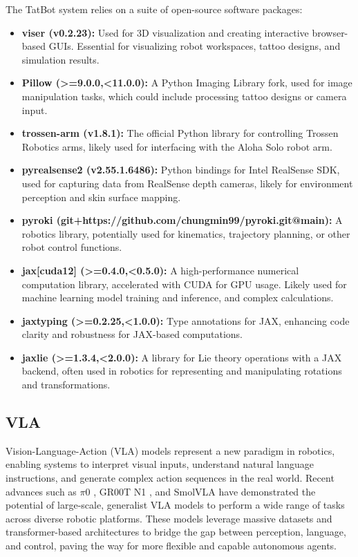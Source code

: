 \documentclass[11pt]{article}
\begin{document}
The TatBot system relies on a suite of open-source software packages:
\begin{itemize}
    \item \textbf{viser (v0.2.23):} Used for 3D visualization and creating interactive browser-based GUIs. Essential for visualizing robot workspaces, tattoo designs, and simulation results.
    \item \textbf{Pillow (>=9.0.0,<11.0.0):} A Python Imaging Library fork, used for image manipulation tasks, which could include processing tattoo designs or camera input.
    \item \textbf{trossen-arm (v1.8.1):} The official Python library for controlling Trossen Robotics arms, likely used for interfacing with the Aloha Solo robot arm.
    \item \textbf{pyrealsense2 (v2.55.1.6486):} Python bindings for Intel RealSense SDK, used for capturing data from RealSense depth cameras, likely for environment perception and skin surface mapping.
    \item \textbf{pyroki (git+https://github.com/chungmin99/pyroki.git@main):} A robotics library, potentially used for kinematics, trajectory planning, or other robot control functions.
    \item \textbf{jax[cuda12] (>=0.4.0,<0.5.0):} A high-performance numerical computation library, accelerated with CUDA for GPU usage. Likely used for machine learning model training and inference, and complex calculations.
    \item \textbf{jaxtyping (>=0.2.25,<1.0.0):} Type annotations for JAX, enhancing code clarity and robustness for JAX-based computations.
    \item \textbf{jaxlie (>=1.3.4,<2.0.0):} A library for Lie theory operations with a JAX backend, often used in robotics for representing and manipulating rotations and transformations.
\end{itemize}

\subsection{VLA}

Vision-Language-Action (VLA) models represent a new paradigm in robotics, enabling systems to interpret visual inputs, understand natural language instructions, and generate complex action sequences in the real world.
Recent advances such as $\pi$0 \cite{Black2024pi0}, GR00T N1 \cite{Bjorck2025gr00t}, and SmolVLA \cite{Shukor2025smolvla} have demonstrated the potential of large-scale, generalist VLA models to perform a wide range of tasks across diverse robotic platforms.
These models leverage massive datasets and transformer-based architectures to bridge the gap between perception, language, and control, paving the way for more flexible and capable autonomous agents.
\end{document}
